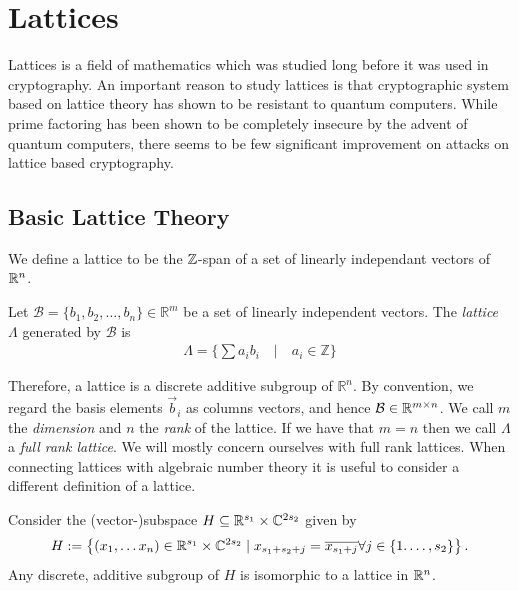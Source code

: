 
\section{Lattices}
\label{Section:Lattice Theory}
    Lattices is a field of mathematics which was studied long before it was used in cryptography\cite{Gjorsteen Lattice Intro}. An important reason to study lattices is that cryptographic system based on lattice theory has shown to be resistant to quantum computers. While prime factoring has been shown to be completely insecure by the advent of quantum computers, there seems to be few significant improvement on attacks on lattice based cryptography. 
    \subsection{Basic Lattice Theory}
    We define a lattice to be the \(\mathbb{Z}\)-span of a set of linearly independant vectors of \(\mathbb{R}^n\).
    \begin{definition}[Lattice]
        Let \(\mathcal{B} = \{b_1, b_2,\dots , b_n\}\in\mathbb{R}^m\) be a set of linearly independent vectors. The \textit{lattice} \(\Lambda\) generated by \(\mathcal{B}\) is 
        \begin{align*}
            \Lambda = \Big\{ \sum a_i b_i \quad | \quad a_i\in\mathbb{Z} \Big\}
        \end{align*}
    \end{definition}
    Therefore, a lattice is a discrete additive subgroup of \(\mathbb{R}^n\). By convention, we regard the basis elements \(\vec{b}_i\) as columns vectors, and hence \(\mathcal{B}\in\mathbb{R}^{m\times n}\). We call \(m\) the \emph{dimension} and \(n\) the \emph{rank} of the lattice. If we have that \(m = n\) then we call \(\Lambda\) a \emph{full rank lattice}. We will mostly concern ourselves with full rank lattices. When connecting lattices with algebraic number theory it is useful to consider a different definition of a lattice.
    \begin{proposition}
        Consider the (vector-)subspace \(H \subseteq \mathbb{R}^{s_1}\times\mathbb{C}^{2s_2}\) given by
        \begin{align*}
            H := \left\{(x_1, \dots x_n) \in \mathbb{R}^{s_1}\times\mathbb{C}^{2s_2}\;|\; x_{s_1 + s_2 + j} = \overline{x_{s_1 + j}}\forall j\in\{1.\dots, s_2\} \right\}.
        \end{align*}
        Any discrete, additive subgroup of \(H\) is isomorphic to a lattice in \(\mathbb{R}^n\).
    \end{proposition}
